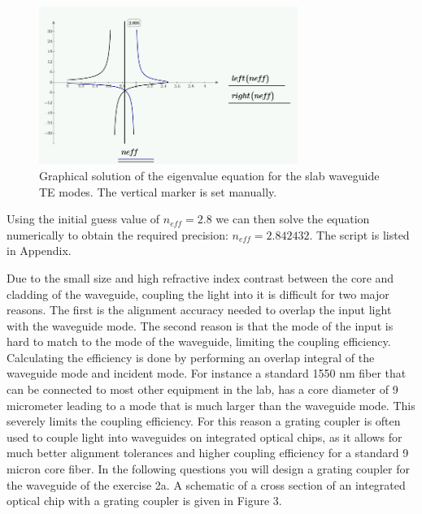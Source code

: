 \documentclass[11pt,a4paper]{article}
\begin{document}
\begin{figure}[ht]
    \centering
    \includegraphics[width=0.75\textwidth]{fig_2.png}
    \caption{Graphical solution of the eigenvalue equation for the slab waveguide TE modes. The vertical marker is set manually.}
\end{figure}

Using the initial guess value of $n_{eff}=2.8$ we can then solve the equation numerically to obtain the required precision: $n_{eff}=2.842432$. The script is listed in Appendix. \\ \par

Due to the small size and high refractive index contrast between the core and cladding of the waveguide, coupling the light into it is difficult for two major reasons. The first is the alignment accuracy needed to overlap the input light with the waveguide mode. The second reason is that the mode of the input is hard to match to the mode of the waveguide, limiting the coupling efficiency. Calculating the efficiency is done by performing an overlap integral of the waveguide mode and incident mode.
For instance a standard 1550 nm fiber that can be connected to most other equipment in the lab, has a core diameter of 9 micrometer leading to a mode that is much larger than the waveguide mode. This severely limits the coupling efficiency. For this reason a grating coupler is often used to couple light into waveguides on integrated optical chips, as it allows for much better alignment tolerances and higher coupling efficiency for a standard 9 micron core fiber. In the following questions you will design a grating coupler for the waveguide of the exercise 2a. A schematic of a cross section of an integrated optical chip with a grating coupler is given in Figure 3.
\end{document}
